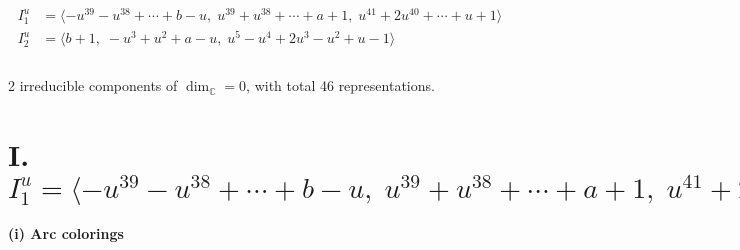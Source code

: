 \documentclass[1p]{elsarticle_modified}
\theoremstyle{definition}
\begin{document}
\begin{align*}
I^u_{1}&=\langle 
- u^{39}- u^{38}+\cdots+b- u,\;u^{39}+u^{38}+\cdots+a+1,\;u^{41}+2 u^{40}+\cdots+u+1\rangle \\
I^u_{2}&=\langle 
b+1,\;- u^3+u^2+a- u,\;u^5- u^4+2 u^3- u^2+u-1\rangle \\
\\
\end{align*}
\raggedright * 2 irreducible components of $\dim_{\mathbb{C}}=0$, with total 46 representations.\\
\newpage
\renewcommand{\arraystretch}{1}
\centering \section*{I. $I^u_{1}= \langle - u^{39}- u^{38}+\cdots+b- u,\;u^{39}+u^{38}+\cdots+a+1,\;u^{41}+2 u^{40}+\cdots+u+1 \rangle$}
\flushleft \textbf{(i) Arc colorings}\\
\end{document}
